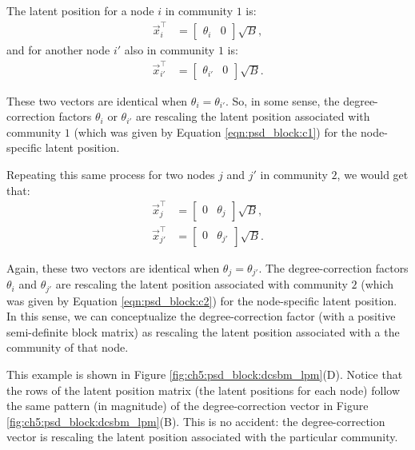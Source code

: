 The latent position for a node $i$ in community $1$ is:
\begin{align*}
    \vec x_i^\top &= \begin{bmatrix}
        \theta_i & 0
    \end{bmatrix} \sqrt B,
\end{align*}
and for another node $i'$ also in community $1$ is:
\begin{align*}
    \vec x_{i'}^\top &= \begin{bmatrix}
        \theta_{i'} & 0 
    \end{bmatrix}\sqrt B.
\end{align*}

These two vectors are identical when $\theta_i = \theta_{i'}$. So, in some sense, the degree-correction factors $\theta_i$ or $\theta_{i'}$ are {rescaling} the latent position associated with community $1$ (which was given by Equation \ref{eqn:psd_block:c1}) for the node-specific latent position. 

Repeating this same process for two nodes $j$ and $j'$ in community $2$, we would get that:
\begin{align*}
    \vec x_j^\top &= \begin{bmatrix}
        0 & \theta_j
    \end{bmatrix} \sqrt B, \\
    \vec x_{j'}^\top &= \begin{bmatrix}
        0 & \theta_{j'} 
    \end{bmatrix}\sqrt B.
\end{align*}

Again, these two vectors are identical when $\theta_j = \theta_{j'}$. The degree-correction factors $\theta_i$ and $\theta_{j'}$ are {rescaling} the latent position associated with community $2$ (which was given by Equation \ref{eqn:psd_block:c2}) for the node-specific latent position. In this sense, we can conceptualize the degree-correction factor (with a positive semi-definite block matrix) as {rescaling} the latent position associated with a the community of that node. 

 This example is shown in Figure \ref{fig:ch5:psd_block:dcsbm_lpm}(D). Notice that the rows of the latent position matrix (the latent positions for each node) follow the same pattern (in magnitude) of the degree-correction vector in Figure \ref{fig:ch5:psd_block:dcsbm_lpm}(B). This is no accident: the degree-correction vector is  {rescaling} the latent position associated with the particular community.

